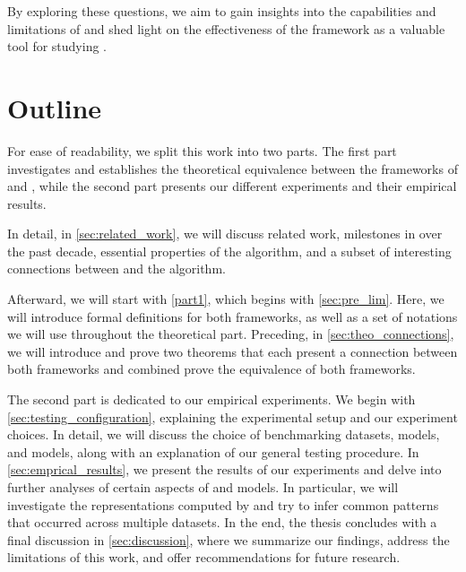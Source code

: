 By exploring these questions, we aim to gain insights into the capabilities and limitations of \gnns and shed light on the effectiveness of the \wlnn framework as a valuable tool for studying \gnns.

\section{Outline}
For ease of readability, we split this work into two parts. The first part investigates and establishes the theoretical equivalence between the frameworks of \wlnn and \gnns, while the second part presents our different experiments and their empirical results.

In detail, in \cref{sec:related_work}, we will discuss related work, milestones in \gnns over the past decade, essential properties of the \wl algorithm, and a subset of interesting connections between \gnns and the \wl algorithm.

Afterward, we will start with \cref{part1}, which begins with \cref{sec:pre_lim}. Here, we will introduce formal definitions for both frameworks, as well as a set of notations we will use throughout the theoretical part. Preceding, in \cref{sec:theo_connections}, we will introduce and prove two theorems that each present a connection between both frameworks and combined prove the equivalence of both frameworks.

The second part is dedicated to our empirical experiments. We begin with \cref{sec:testing_configuration}, explaining the experimental setup and our experiment choices. In detail, we will discuss the choice of benchmarking datasets, \gnn models, and \wlnn models, along with an explanation of our general testing procedure. In \cref{sec:emprical_results}, we present the results of our experiments and delve into further analyses of certain aspects of \gnn and \wlnn models. In particular, we will investigate the representations computed by \gnns and try to infer common patterns that occurred across multiple datasets. In the end, the thesis concludes with a final discussion in \cref{sec:discussion}, where we summarize our findings, address the limitations of this work, and offer recommendations for future research.